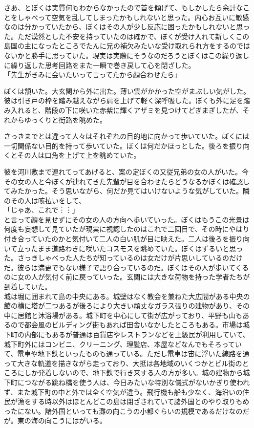 \documentclass[b5j,twoside,twocolumn]{utarticle}
\begin{document}
さあ、とぼくは実質何もわからなかったので首を傾げて、もしかしたら余計なことをしゃべって空気を乱してしまったかもしれないと思った。内心お互いに敏感なのは分かっていたから、ぼくはその人が少し反応に困ったかもしれないと思った。ただ漠然とした不安を持っていたのは確かで、ぼくが受け入れて新しくこの島国の主になったところでたんに兄の補欠みたいな受け取れられ方をするのではないかと勝手に思っていた。現実は実際にそうなのだろうとぼくはこの繰り返しに繰り返した思考回路をまた一瞬で巻き戻して心を閉ざした。\\
「先生がきみに会いたいって言ってたから顔合わせたら」


ぼくは頷いた。大玄関から外に出た。薄い雲がかかった空がまぶしい気がした。彼は引き戸の枠を踏み越えながら肩を上げて軽く深呼吸した。ぼくも外に足を踏み入れると、階段の下に咲いた赤紫に輝くアザミを見つけてどぎまぎしたが、それからゆっくりと街路を眺めた。


さっきまでとは違って人々はそれぞれの目的地に向かって歩いていた。ぼくには一切関係ない目的を持って歩いていた。ぼくは何だかほっとした。後ろを振り向くとその人は口角を上げて上を眺めていた。


彼を河川敷まで連れてってあげると、案の定ぼくの又従兄弟の女の人がいた。今その女の人と今ぼくが連れてきた先輩が目を合わせたらどうなるかぼくは確認してみたかった。そう思いながら、何だか見てはいけないような気がしていた。隣のその人は咳払いをして、\\
「じゃあ、これで︙︙」\\
と言って顔を見せずにその女の人の方向へ歩いていった。ぼくはもうこの光景は何度も妄想して見ていたが現実に視認したのはこれで二回目で、その時にやはり付き合っていたのかと気付いて二人の白い肌が目に映えた。二人は後ろを振り向いて立ったまま道路わきに咲いたコスモスを眺めていた。ぼくはずるいと思った。さっきしゃべった人たちが知っているのは女だけが片思いしているのだけだ。彼らは満更でもない様子で語り合っているのだ。ぼくはその人が歩いてくるのに女の人が気付く前に戻っていった。玄関には大きな荷物を持った学者たちが到着していた。\\



城は堀に囲まれて島の中央にある。城壁はなく教会を兼ねた大広間がある中央の館の横に塔が二つあるが後ろにより大きい頑丈なガラス張りの建物があり、その中に居館と沐浴場がある。城下町を中心にして街が広がっており、平野も山もあるので都会風のビルディング街もあれば田舎いなかしたところもある。市場は城下町の内部にもあるが普通は百貨店やレストランなどを上級民が利用していて、城下町外にはコンビニ、クリーニング、理髪店、本屋などなんでもそろっていて、電車や地下鉄といったものも通っている。ただし電車は宙に浮いた線路を通って大きな軌道を描きながら走っており、大抵は各地域のいくつかとビル街のところにしか発着しないので、地下鉄で行き来する人の方が多い。城の建物から城下町につながる跳ね橋を使う人は、今日みたいな特別な儀式がないかぎり使われず、また城下町の中と外では全く空気が違う。飛行機も船も少なく、海沿いの住民が漁をする時以外はほとんどこの島は閉ざされていて諸外国とのやり取りもめったにない。諸外国といっても灘の向こうの小都ぐらいの規模であるだけなのだが。東の海の向こうにはがいる。\\
\end{document}
